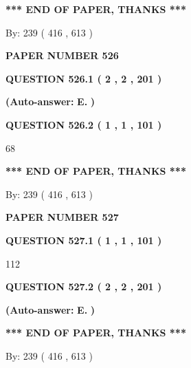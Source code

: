 \documentclass{ctexart}
\begin{document}
 
   
   
   
   
\vspace{1.0in} 
{\textbf{\large{ *** END OF PAPER, THANKS *** }}} 
   
   
\hspace{1.0in} By: 
 239 ( 416 ,  613 )
   
   
   
   
\newpage 
\setcounter{page}{ 
   526001 } 
   
   
 {\textbf{ \Large{ PAPER NUMBER  526  }}}
   
   
   
   
  
  
{\textbf{\large{QUESTION
526.1 
 ( 2 , 2 , 201 )
}}}
 
 
{\textbf{(Auto-answer:}}
{\textbf{\large{
E.}}}
{\textbf{)}}
 
 
  
  
{\textbf{\large{QUESTION
526.2 
 ( 1 , 1 , 101 )
}}}

68
   
   
   
   
\vspace{1.0in} 
{\textbf{\large{ *** END OF PAPER, THANKS *** }}} 
   
   
\hspace{1.0in} By: 
 239 ( 416 ,  613 )
   
   
   
   
\newpage 
\setcounter{page}{ 
   527001 } 
   
   
 {\textbf{ \Large{ PAPER NUMBER  527  }}}
   
   
   
   
  
  
{\textbf{\large{QUESTION
527.1 
 ( 1 , 1 , 101 )
}}}

112
  
  
{\textbf{\large{QUESTION
527.2 
 ( 2 , 2 , 201 )
}}}
 
 
{\textbf{(Auto-answer:}}
{\textbf{\large{
E.}}}
{\textbf{)}}
 
 
   
   
   
   
\vspace{1.0in} 
{\textbf{\large{ *** END OF PAPER, THANKS *** }}} 
   
   
\hspace{1.0in} By: 
 239 ( 416 ,  613 )
   
   
   
   
\newpage 
\setcounter{page}{ 
   528001 } 
   
\end{document}
